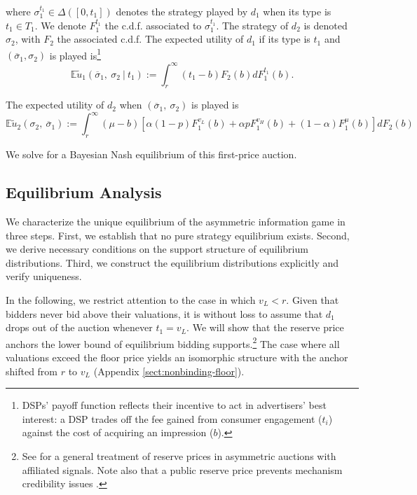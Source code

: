 \noindent where $ \sigma_1^{t_1} \in \Delta\left([0, t_1]\right) $ denotes the strategy played by $ d_1 $ when its type is $ t_1 \in T_1 $. We denote $ F_1^{t_1} $ the c.d.f. associated to $ \sigma_1^{t_1} $. The strategy of $ d_2 $ is denoted $ \sigma_2 $, with $ F_2 $ the associated c.d.f. The expected utility of $ d_1 $ if its type is $ t_1 $ and $ \left( \overline{\sigma}_1, \sigma_2 \right) $ is played is\footnote{DSPs' payoff function reflects their incentive to act in advertisers' best interest: a DSP trades off the fee gained from consumer engagement ($t_i$) against the cost of acquiring an impression ($b$).}
\begin{equation*}
 \mathbb{E}\tilde{u}_1 \left( \overline{\sigma}_1, \ \sigma_2 \ \big| \ t_1  \right) := \int_{r}^{\infty} (t_1 - b) F_2(b) d F_1^{t_1}(b).
\end{equation*}

\noindent  The expected utility of $ d_2 $ when $ \left( \overline{\sigma}_1,\ \sigma_2 \right) $ is played is
\begin{equation*}
\mathbb{E}\tilde{u}_2 \left( \sigma_2,\ \overline{\sigma}_1 \right) := \int_{r}^{\infty} (\mu - b) \left[ \alpha (1 - p) F_1^{v_L}(b) + \alpha p F_1^{v_H}(b) + (1 - \alpha) F_1^{\mu}(b) \right] d F_2(b)
\end{equation*}

\noindent We solve for a Bayesian Nash equilibrium of this first-price auction.

\subsection{Equilibrium Analysis}
\noindent We characterize the unique equilibrium of the asymmetric information game in three steps. First, we establish that no pure strategy equilibrium exists. Second, we derive necessary conditions on the support structure of equilibrium distributions. Third, we construct the equilibrium distributions explicitly and verify uniqueness.

\noindent In the following, we restrict attention to the case in which $v_L < r$. Given that bidders never bid above their valuations, it is without loss to assume that $d_1$ drops out of the auction whenever $t_1 = v_L$. We will show that the reserve price anchors the lower bound of equilibrium bidding supports.\footnote{See \textcite{lizzeriUniquenessExistenceEquilibrium2000} for a general treatment of reserve prices in asymmetric auctions with affiliated signals. Note also that a public reserve price prevents mechanism credibility issues \parencite{banchioDynamicThreatsCredible}.} The case where all valuations exceed the floor price yields an isomorphic structure with the anchor shifted from $r$ to $v_L$ (Appendix \ref{sect:nonbinding-floor}).

